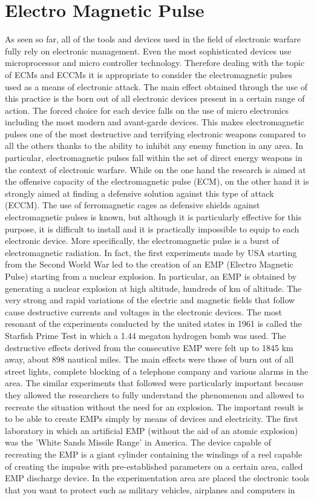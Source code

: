 \documentclass[12pt]{report}
\begin{document}
\section{Electro Magnetic Pulse}
As seen so far, all of the tools and devices used in the field of electronic warfare fully rely on electronic management. Even the most sophisticated devices use microprocessor and micro controller technology. Therefore dealing with the topic of ECMs and ECCMs it is appropriate to consider the electromagnetic pulses used as a means of electronic attack. \cite{emp2} The main effect obtained through the use of this practice is the born out of all electronic devices present in a certain range of action. The forced choice for each device falls on the use of micro electronics including the most modern and avant-garde devices. This makes electromagnetic pulses one of the most destructive and terrifying electronic weapons compared to all the others thanks to the ability to inhibit any enemy function in any area. In particular, electromagnetic pulses fall within the set of direct energy weapons in the context of electronic warfare. While on the one hand the research is aimed at the offensive capacity of the electromagnetic pulse (ECM), on the other hand it is strongly aimed at finding a defensive solution against this type of attack (ECCM). The use of ferromagnetic cages as defensive shields against electromagnetic pulses is known, but although it is particularly effective for this purpose, it is difficult to install and it is practically impossible to equip to each electronic device. More specifically, the electromagnetic pulse is a burst of electromagnetic radiation. In fact, the first experiments made by USA starting from the Second World War led to the creation of an EMP (Electro Magnetic Pulse) starting from a nuclear explosion. In particular, an EMP is obtained by generating a nuclear explosion at high altitude, hundreds of km of altitude. The very strong and rapid variations of the electric and magnetic fields that follow cause destructive currents and voltages in the electronic devices. The most resonant of the experiments conducted by the united states in 1961 is called the Starfish Prime Test in which a 1.44 megaton hydrogen bomb was used. The destructive effects derived from the consecutive EMP were felt up to 1845 km away, about 898 nautical miles. The main effects were those of burn out of all street lights, complete blocking of a telephone company and various alarms in the area. The similar experiments that followed were particularly important because they allowed the researchers to fully understand the phenomenon and allowed to recreate the situation without the need for an explosion. The important result is to be able to create EMPs simply by means of devices and electricity. The first laboratory in which an artificial EMP (without the aid of an atomic explosion) was the 'White Sands Missile Range' in America. The device capable of recreating the EMP is a giant cylinder containing the windings of a reel capable of creating the impulse with pre-established parameters on a certain area, called EMP discharge device. In the experimentation area are placed the electronic tools that you want to protect such as military vehicles, airplanes and computers in 
\end{document}
